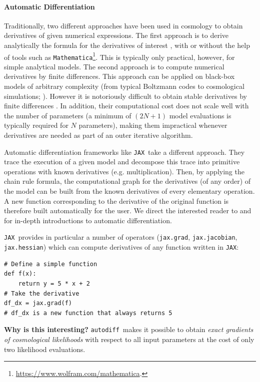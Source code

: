 \documentclass[twocolumn,twocolappendix,nofootinbib,iop]{openjournal}
\newcommand{\autodiff}{\texttt{autodiff}}
\newcommand{\jax}{\texttt{JAX}}
\begin{document}
\paragraph{\textbf{Automatic Differentiation}} Traditionally, two different approaches have been used in cosmology to obtain derivatives of given numerical expressions. The first approach is to derive analytically the formula for the derivatives of interest \citep[e.g.][]{2013MNRAS.432..894J}, with or without the help of tools such as \texttt{Mathematica}\footnote{\url{https://www.wolfram.com/mathematica}.}. This is typically only practical, however, for simple analytical models.
The second approach is to compute numerical derivatives by finite differences. This approach can be applied on black-box models of arbitrary complexity (from typical Boltzmann codes to cosmological simulations; \citealp{2020ApJS..250....2V}). However it is notoriously difficult to obtain stable derivatives by finite differences \citep[e.g.][]{2021arXiv210100298B, 2021A&A...649A..52Y}. In addition, their computational cost does not scale well with the number of parameters (a minimum of $(2N+1)$ model evaluations is typically required for $N$ parameters), making them impractical whenever derivatives are needed as part of an outer iterative algorithm.

Automatic differentiation frameworks like \jax\ take a different approach. They trace the execution of a given model and decompose this trace into primitive operations with known derivatives (e.g. multiplication). Then, by applying the chain rule formula, the computational graph for the derivatives (of any order) of the model can be built from the known derivatives of every elementary operation. A new function corresponding to the derivative of the original function is therefore built automatically for the user. We direct the interested reader to \citet{baydin2018automatic} and \citet{Margossian2019} for in-depth introductions to automatic differentiation. 

\jax\ provides in particular a number of operators (\texttt{jax.grad}, \texttt{jax.jacobian}, \texttt{jax.hessian}) which can compute derivatives of any function written in \jax:
\begin{lstlisting}[language=iPython]
# Define a simple function 
def f(x):
	return y = 5 * x + 2
# Take the derivative
df_dx = jax.grad(f)
# df_dx is a new function that always returns 5 
\end{lstlisting}

\textbf{Why is this interesting?} \autodiff\ makes it possible to obtain \textit{exact gradients of cosmological likelihoods} with respect to all input parameters at the cost of only two likelihood evaluations.
\end{document}
